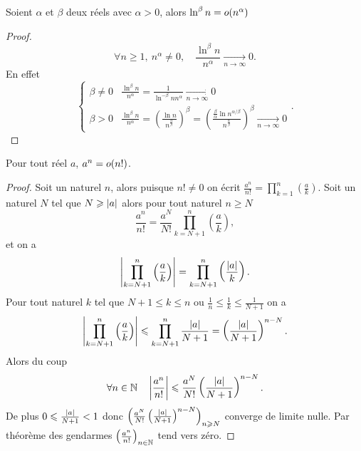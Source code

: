 \begin{prop}
    Soient \(\alpha\) et \(\beta\) deux réels avec \(\alpha>0\), alors 
    \(\ln^\beta n = o\mathopen{}\left(n^\alpha\right)\)
\end{prop}
\begin{proof}
    \begin{equation}
        \forall n \geqslant 1, \ n^\alpha \neq 0, \quad \frac{\ln^\beta 
        n}{n^\alpha} \underset{n\to \infty}{\longrightarrow} 0.
    \end{equation}
    En effet
    \begin{equation}
        \begin{cases}
            \beta \neq 0 & \frac{\ln^\beta n}{n^\alpha} = \frac{1}{\ln^{-\beta} n 
            n^\alpha} \underset{n\to \infty}{\longrightarrow} 0 \\
            \beta > 0 & \frac{\ln^\beta n}{n^\alpha} = \left(\frac{\ln 
            n}{n^{\frac{\alpha}{\beta}}}\right)^\beta = 
            \left(\frac{\frac{\beta}{\alpha}\ln 
            n^{\alpha/\beta}}{n^{\frac{\alpha}{\beta}}}\right)^\beta 
            \underset{n\to \infty}{\longrightarrow} 0
        \end{cases}.
    \end{equation}
\end{proof}

\begin{prop}
    Pour tout réel \(a\), \(a^n = o\mathopen{}\left(n!\right)\).
\end{prop}
\begin{proof}
    Soit un naturel \(n\), alors puisque \(n! \neq 0\) on écrit 
    \(\frac{a^n}{n!}=\prod_{k = 1}^n \left(\frac{a}{k}\right)\). Soit un 
    naturel \(N\) tel que \(N \geqslant \left\lvert a\right\rvert\) alors pour tout 
    naturel \(n \geqslant N\)
    \begin{equation}
        \frac{a^n}{n!} = \frac{a^N}{N!} \prod_{k = N+1}^n 
        \left(\frac{a}{k}\right),
    \end{equation}
    et on a
    \begin{equation}
        \left\lvert\prod_{k = N+1}^n \left(\frac{a}{k}\right)\right\rvert = \prod_{k = 
        N+1}^n \left(\frac{\left\lvert a\right\rvert}{k}\right).
    \end{equation}
    Pour tout naturel \(k\) tel que \(N+1 \leqslant k \leqslant n\) ou 
    \(\frac{1}{n} \leqslant \frac{1}{k} \leqslant \frac{1}{N+1}\) on a
    \begin{equation}
        \left\lvert\prod_{k = N+1}^n \left(\frac{a}{k}\right)\right\rvert \leqslant 
        \prod_{k = N+1}^n \frac{\left\lvert a\right\rvert}{N+1} = 
        \left(\frac{\left\lvert a\right\rvert}{N+1}\right)^{n-N}.
    \end{equation}
    Alors du coup
    \begin{equation}
        \forall n \in \mathbb{N} \quad \left\lvert\frac{a^n}{n!}\right\rvert \leqslant 
        \frac{a^N}{N!} \left(\frac{\left\lvert a\right\rvert}{N+1}\right)^{n-N}.
    \end{equation}
    De plus \(0 \leqslant \frac{\left\lvert a\right\rvert}{N+1} < 1\) donc 
    \(\left(\frac{a^N}{N!} 
    \left(\frac{\left\lvert a\right\rvert}{N+1}\right)^{n-N}\right)_{n \geqslant N}\) 
    converge de limite nulle. Par théorème des gendarmes 
    \(\left(\frac{a^n}{n!}\right)_{n\in \mathbb{N}}\) tend vers zéro.
\end{proof}

